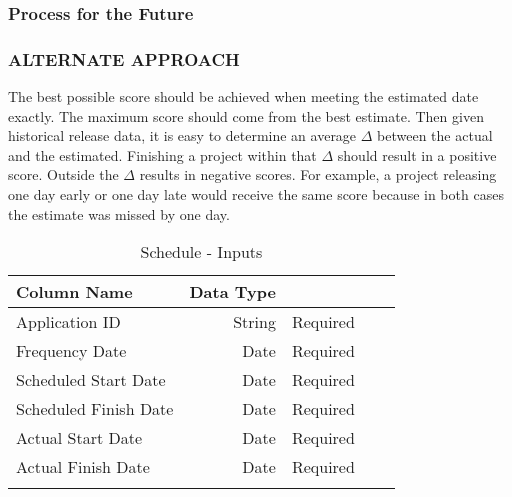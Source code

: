 \documentclass[SDSUThesis.tex]{subfiles}
\begin{document}
    \subsubsection{Process for the Future}
    
    \subsubsection{ALTERNATE APPROACH}
    The best possible score should be achieved
            when meeting the estimated date exactly.  The maximum score
            should come from the best estimate.  Then given historical
            release data, it is easy to determine an 
            average $\Delta$ between the actual and the estimated.  
            Finishing a project within that $\Delta$ should result 
            in a positive score.  Outside the $\Delta$ results in
            negative scores.  For example, a project releasing
            one day early or one day late would receive the same score
            because in both cases the estimate was missed by one day.


\begin{longtable}{@{}l rr rr}

\toprule%
 \centering%
 {\bfseries Column Name}
 & {\bfseries Data Type}
 &  \\

\cmidrule[0.4pt](r{0.125em}){1-1}%
\cmidrule[0.4pt](lr{0.125em}){2-2}%
\cmidrule[0.4pt](l{0.125em}){3-3}%
\endhead

Application ID & String  & Required \\
\myrowcolour%
Frequency Date & Date & Required \\
Scheduled Start Date & Date & Required \\
\myrowcolour%
Scheduled Finish Date & Date & Required \\
Actual Start Date & Date  & Required \\
\myrowcolour%
Actual Finish Date & Date  & Required \\

\bottomrule

\caption{Schedule - Inputs}
\label{tab:sched}
\end{longtable}
\end{document}
